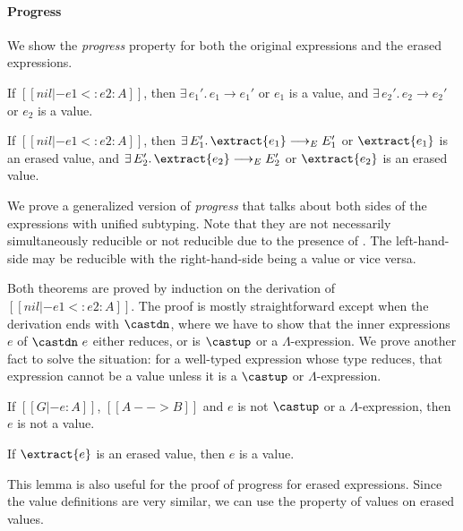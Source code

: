 \paragraph{Progress} We show the \emph{progress} property for both
the original expressions and the erased expressions.

\begin{theorem}
    If $[[nil |- e1 <: e2 : A]]$,
    then $\exists \, e_1'. \, e_1 \longrightarrow e_1'$ or $e_1$ is a value,
    and $\exists \, e_2'. \, e_2 \longrightarrow e_2'$ or $e_2$ is a value.
\end{theorem}

\begin{theorem}
    If $[[nil |- e1 <: e2 : A]]$,
    then $\exists \, E_1'. \, \extract{e_1} \longrightarrow_E E_1'$ or $\extract{e_1}$ is an erased value,
    and $\exists \, E_2'. \, \extract{e_2} \longrightarrow_E E_2'$ or $\extract{e_2}$ is an erased value.
\end{theorem}

\noindent We prove a generalized version of \emph{progress} that talks about both sides
of the expressions with unified subtyping. Note that they are not necessarily
simultaneously reducible or not reducible due to the presence of .
The left-hand-side may be reducible with the right-hand-side being a value or vice versa.

Both theorems are proved by induction on the derivation of $[[nil |- e1 <: e2 : A]]$.
The proof is mostly straightforward except when the derivation ends with $\castdn$,
where we have to show that the inner expressions $e$ of $\castdn~e$ either reduces, or
is $\castup$ or a $\Lambda$-expression. We prove another fact to solve the situation:
for a well-typed expression whose type reduces, that expression
cannot be a value unless it is a $\castup$ or $\Lambda$-expression.

\begin{lemma}
    If $[[G |- e : A]]$, $[[A --> B]]$ and $e$ is not $\castup$ or a $\Lambda$-expression,
    then $e$ is not a value.
\end{lemma}

\begin{lemma}
    If $\extract{e}$ is an erased value, then $e$ is a value.
\end{lemma}

This lemma is also useful for the proof of progress for erased expressions.
Since the value definitions are very similar, we can use the property of values
on erased values.

